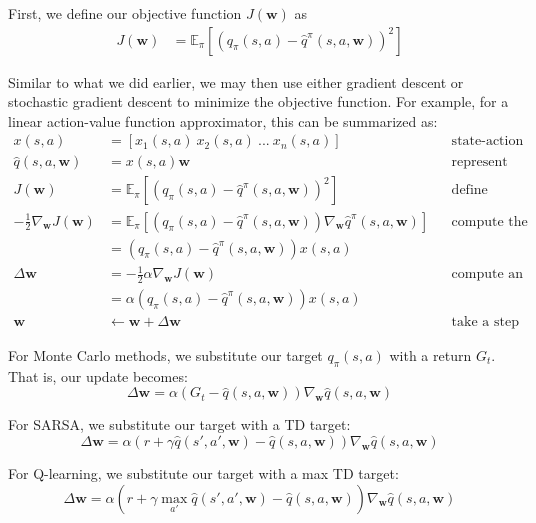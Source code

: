 \documentclass{article}
\newcommand{\E}{\mathbb{E}}                                        %
\newcommand{\w}{\mathbf{w}}
\begin{document}
First, we define our objective function $J(\w)$ as
\begin{align*}
J(\w) & = \E_{\pi} [(q_{\pi} (s,a) - \hat{q}^{\pi} (s,a,\w) )^2]
\end{align*}

Similar to what we did earlier, we may then use either gradient descent or stochastic gradient descent to minimize the objective function. For example, for a linear action-value function approximator, this can be summarized as:
\begin{align*}
x(s,a) & = [x_1(s,a)\ x_2(s,a)\ ...\ x_n(s,a)] && \text{state-action value features} \\
\hat{q} (s,a,\w) & = x(s,a) \w && \text{represent state-action value as linear combinations of features} \\
J(\w) & = \E_{\pi} [(q_{\pi} (s,a) - \hat{q}^{\pi} (s,a,\w) )^2] && \text{define objective function} \\
-\frac{1}{2}\nabla_{\w} J(\w) & = \E_{\pi} [(q_{\pi} (s,a) - \hat{q}^{\pi} (s,a,\w) ) \nabla_{\w}  \hat{q}^{\pi} (s,a,\w)] && \text{compute the gradient} \\
& = (q_{\pi} (s,a) - \hat{q}^{\pi} (s,a,\w) ) x(s,a) \\
\Delta \w & = - \frac{1}{2} \alpha \nabla_{\w} J(\w) && \text{compute an update step using gradient descent} \\
& = \alpha (q_{\pi} (s,a) - \hat{q}^{\pi} (s,a,\w) ) x(s,a) \\
\w & \gets \w + \Delta \w && \text{take a step towards the local minimum}
\end{align*}

For Monte Carlo methods, we substitute our target $q_{\pi} (s,a)$ with a return $G_t$. That is, our update becomes:
\begin{equation*}
\Delta \w = \alpha (G_t - \hat{q} (s,a,\w) ) \nabla_{\w}  \hat{q} (s,a,\w)
\end{equation*}

For SARSA, we substitute our target with a TD target:
\begin{equation*}
\Delta \w = \alpha (r+\gamma \hat{q} (s',a',\w) - \hat{q} (s,a,\w) ) \nabla_{\w}  \hat{q} (s,a,\w)
\end{equation*}

For Q-learning, we substitute our target with a max TD target:
\begin{equation*}
\Delta \w = \alpha (r+\gamma \max_{a'} \hat{q} (s',a',\w) - \hat{q} (s,a,\w) ) \nabla_{\w}  \hat{q} (s,a,\w)
\end{equation*}
\end{document}
